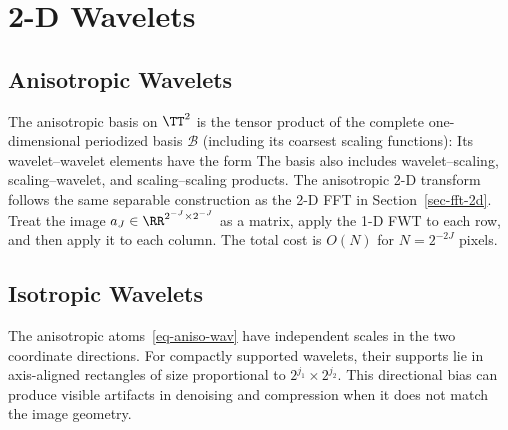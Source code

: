 \section{2-D Wavelets}

                                                   
\subsection{Anisotropic Wavelets}

The anisotropic basis on $\TT^2$ is the tensor product of the complete one-dimensional periodized basis $\mathcal B$ (including its coarsest scaling functions):
Its wavelet--wavelet elements have the form
The basis also includes wavelet--scaling, scaling--wavelet, and scaling--scaling products.
The anisotropic 2-D transform follows the same separable construction as the 2-D FFT in Section~\ref{sec-fft-2d}. Treat the image $a_J \in \RR^{2^{-J} \times 2^{-J}}$ as a matrix, apply the 1-D FWT to each row, and then apply it to each column. The total cost is $O(N)$ for $N=2^{-2J}$ pixels.


                                                   
\subsection{Isotropic Wavelets}\label{sec-isotropic-wav}

The anisotropic atoms~\eqref{eq-aniso-wav} have independent scales in the two coordinate directions. For compactly supported wavelets, their supports lie in axis-aligned rectangles of size proportional to $2^{j_1}\times2^{j_2}$. This directional bias can produce visible artifacts in denoising and compression when it does not match the image geometry.


